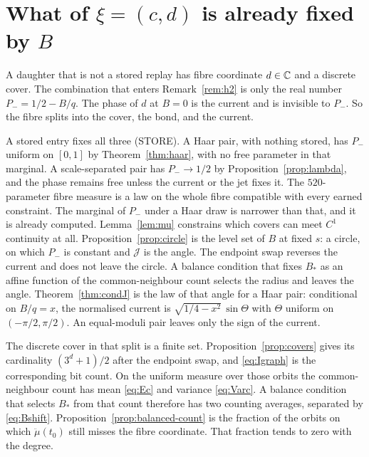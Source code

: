 \section{\texorpdfstring{What of \(\xi=(c,d)\) is already fixed by \(B\)}{What of xi=(c,d) is already fixed by B}}
\label{sec:h-split}

A daughter that is not a stored replay has fibre coordinate \(d\in\mathbb{C}\) and a
discrete cover.
The combination that enters Remark~\ref{rem:h2} is only the real number
\(P_-=1/2-B/q\).
The phase of \(d\) at \(B=0\) is the current and is invisible to \(P_-\).
So the fibre splits into the cover, the bond, and the current.

A stored entry fixes all three (STORE).
A Haar pair, with nothing stored, has \(P_-\) uniform on \([0,1]\)
by Theorem~\ref{thm:haar}, with no free parameter in that marginal.
A scale-separated pair has \(P_-\to 1/2\) by Proposition~\ref{prop:lambda},
and the phase remains free unless the current or the jet fixes it.
The \(520\)-parameter fibre measure is a law on the whole fibre compatible
with every earned constraint.
The marginal of \(P_-\) under a Haar draw is narrower than that, and it is
already computed.
Lemma~\ref{lem:mu} constrains which covers can meet \(C^1\) continuity at all.
Proposition~\ref{prop:circle} is the level set of \(B\) at fixed \(s\):
a circle, on which \(P_-\) is constant and \(\mathcal{J}\) is the angle.
The endpoint swap reverses the current and does not leave the circle.
A balance condition that fixes \(B_*\) as an affine function of the
common-neighbour count selects the radius and leaves the angle.
Theorem~\ref{thm:condJ} is the law of that angle for a Haar pair:
conditional on \(B/q=x\), the normalised current is
\(\sqrt{1/4-x^2}\,\sin\Theta\) with \(\Theta\) uniform on
\((-\pi/2,\pi/2)\).
An equal-moduli pair leaves only the sign of the current.

The discrete cover in that split is a finite set.
Proposition~\ref{prop:covers} gives its cardinality \((3^d+1)/2\) after the
endpoint swap, and \eqref{eq:Igraph} is the corresponding bit count.
On the uniform measure over those orbits the common-neighbour count has
mean \eqref{eq:Ec} and variance \eqref{eq:Varc}.
A balance condition that selects \(B_*\) from that count therefore has two
counting averages, separated by \eqref{eq:Bshift}.
Proposition~\ref{prop:balanced-count} is the fraction of the orbits on
which \(\ddot\mu(t_0)\) still misses the fibre coordinate.
That fraction tends to zero with the degree.
